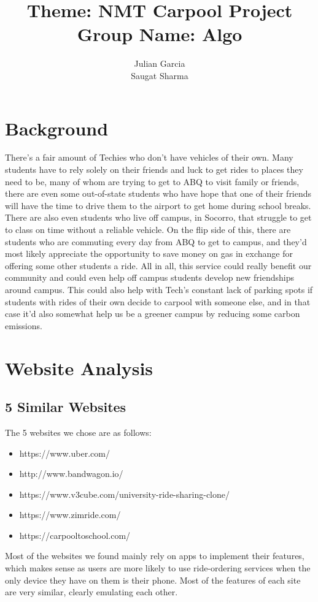 \documentclass[10pt]{article}
\title{Theme: NMT Carpool Project \\ Group Name: Algo}
\author{Julian Garcia \\ Saugat Sharma}
\begin{document}
\maketitle

\section{Background}
There's a fair amount of Techies who don’t have vehicles of their own. Many students have to rely solely on their friends and luck to get rides to places they need to be, many of whom are trying to get to ABQ to visit family or friends, there are even some out-of-state students who have hope that one of their friends will have the time to drive them to the airport to get home during school breaks.  There are also even students who live off campus, in Socorro, that struggle to get to class on time without a reliable vehicle. On the flip side of this, there are students who are commuting every day from ABQ to get to campus, and they'd most likely appreciate the opportunity to save money on gas in exchange for offering some other students a ride. All in all, this service could really benefit our community and could even help off campus students develop new friendships around campus. This could also help with Tech’s constant lack of parking spots if students with rides of their own decide to carpool with someone else, and in that case it'd also somewhat help us be a greener campus by reducing some carbon emissions.

\section{Website Analysis}

\subsection{5 Similar Websites}
The 5 websites we chose are as follows:
\begin{itemize}
  \item https://www.uber.com/
  \item http://www.bandwagon.io/
  \item https://www.v3cube.com/university-ride-sharing-clone/
  \item https://www.zimride.com/
  \item https://carpooltoschool.com/
\end{itemize}
Most of the websites we found mainly rely on apps to implement their features, which makes sense as users are more likely to use ride-ordering services when the only device they have on them is their phone. Most of the features of each site are very similar, clearly emulating each other.
\end{document}
